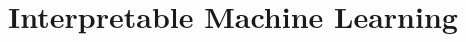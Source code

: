 \documentclass[11pt,compress,t,notes=noshow, aspectratio=169, xcolor=table]{beamer}
\title{Interpretable Machine Learning}
\date{}
\begin{document}
\newcommand{\titlefigure}{figure/ale_plot.pdf}
\newcommand{\learninggoals}{
\item PD plots and its extrapolation issue
\item M plots and its omitted-variable bias
\item Understand ALE plots
}

%
%
%
%
%
%
%
%




\end{document}
